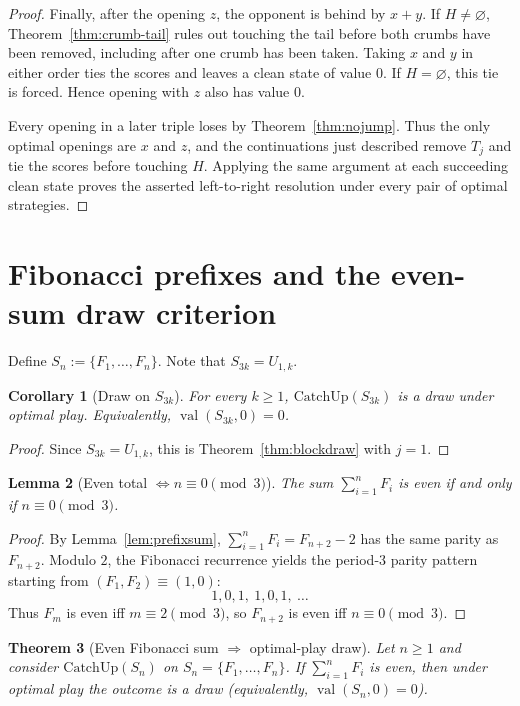 \documentclass[11pt]{article}
\newtheorem{theorem}{Theorem}[section]
\newtheorem{lemma}[theorem]{Lemma}
\newtheorem{corollary}[theorem]{Corollary}
\newcommand{\CatchUp}{\mathrm{CatchUp}}
\newcommand{\val}{\operatorname{val}}
\begin{document}
\begin{proof}
Finally, after the opening $z$, the opponent is behind by $x+y$.
If $H\ne\varnothing$, Theorem~\ref{thm:crumb-tail} rules out touching
the tail before both crumbs have been removed, including after one crumb
has been taken. Taking $x$ and $y$ in either order ties the scores and
leaves a clean state of value $0$. If $H=\varnothing$, this tie is forced.
Hence opening with $z$ also has value $0$.

Every opening in a later triple loses by Theorem~\ref{thm:nojump}.
Thus the only optimal openings are $x$ and $z$, and the continuations
just described remove $T_j$ and tie the scores before touching $H$.
Applying the same argument at each succeeding clean state proves
the asserted left-to-right resolution under every pair of optimal strategies.
\end{proof}

\section{Fibonacci prefixes and the even-sum draw criterion}

Define $S_n:=\{F_1,\dots,F_n\}$. Note that $S_{3k}=U_{1,k}$.

\begin{corollary}[Draw on $S_{3k}$]\label{cor:S3k}
For every $k\ge 1$, $\CatchUp(S_{3k})$ is a draw under optimal play.
Equivalently, $\val(S_{3k},0)=0$.
\end{corollary}

\begin{proof}
Since $S_{3k}=U_{1,k}$, this is Theorem~\ref{thm:blockdraw} with $j=1$.
\end{proof}

\begin{lemma}[Even total $\Longleftrightarrow n\equiv 0\pmod 3$]\label{lem:eveniff}
The sum $\sum_{i=1}^nF_i$ is even if and only if $n\equiv 0\pmod 3$.
\end{lemma}

\begin{proof}
By Lemma~\ref{lem:prefixsum}, $\sum_{i=1}^nF_i=F_{n+2}-2$ has the same parity as $F_{n+2}$.
Modulo $2$, the Fibonacci recurrence yields the period-$3$ parity pattern starting from $(F_1,F_2)\equiv(1,0)$:
\[
1,0,1,\ 1,0,1,\ \dots
\]
Thus $F_m$ is even iff $m\equiv 2\pmod 3$, so $F_{n+2}$ is even iff $n\equiv 0\pmod 3$.
\end{proof}

\begin{theorem}[Even Fibonacci sum $\Rightarrow$ optimal-play draw]\label{thm:main}
Let $n\ge 1$ and consider $\CatchUp(S_n)$ on $S_n=\{F_1,\dots,F_n\}$.
If $\sum_{i=1}^nF_i$ is even, then under optimal play the outcome is a draw (equivalently, $\val(S_n,0)=0$).
\end{theorem}
\end{document}
